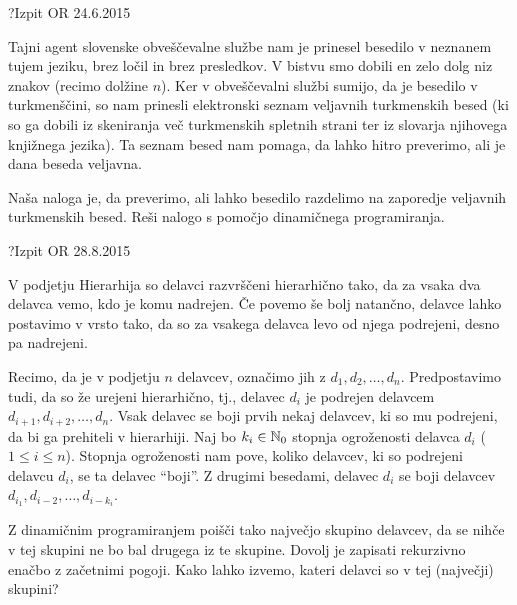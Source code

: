 \begin{naloga}{?}{Izpit OR 24.6.2015}
\begin{vprasanje}
Tajni agent slovenske obveščevalne službe
nam je prinesel besedilo v neznanem tujem jeziku,
brez ločil in brez presledkov.
V bistvu smo dobili en zelo dolg niz znakov (recimo dolžine $n$).
Ker v obveščevalni službi sumijo, da je besedilo v turkmenščini,
so nam prinesli elektronski seznam veljavnih turkmenskih besed
(ki so ga dobili iz skeniranja več turkmenskih spletnih strani
ter iz slovarja njihovega knjižnega jezika).
Ta seznam besed nam pomaga, da lahko hitro preverimo,
ali je dana beseda veljavna.

Naša naloga je, da preverimo,
ali lahko besedilo razdelimo na zaporedje veljavnih turkmenskih besed.
Reši nalogo s pomočjo dinamičnega programiranja.
\end{vprasanje}
\begin{odgovor}
\end{odgovor}
\end{naloga}


\begin{naloga}{?}{Izpit OR 28.8.2015}
\begin{vprasanje}
V podjetju Hierarhija so delavci razvrščeni hierarhično tako,
da za vsaka dva delavca vemo, kdo je komu nadrejen.
Če povemo še bolj natančno, delavce lahko postavimo v vrsto tako,
da so za vsakega delavca levo od njega podrejeni, desno pa nadrejeni.

Recimo, da je v podjetju $n$ delavcev, označimo jih z $d_1, d_2, \dots, d_n$.
Predpostavimo tudi, da so že urejeni hierarhično,
tj., delavec $d_i$ je podrejen delavcem $d_{i+1}, d_{i+2}, \dots, d_n$.
Vsak delavec se boji prvih nekaj delavcev, ki so mu podrejeni,
da bi ga prehiteli v hierarhiji.
Naj bo $k_i \in \mathbb{N}_0$ stopnja ogroženosti delavca $d_i$ ($1 \le i \le n$).
Stopnja ogroženosti nam pove,
koliko delavcev, ki so podrejeni delavcu $d_i$, se ta delavec ``boji''.
Z drugimi besedami,
delavec $d_i$ se boji delavcev $d_{i_1}, d_{i-2}, \dots, d_{i-k_i}$.

Z dinamičnim programiranjem poišči tako največjo skupino delavcev,
da se nihče v tej skupini ne bo bal drugega iz te skupine.
Dovolj je zapisati rekurzivno enačbo z začetnimi pogoji.
Kako lahko izvemo, kateri delavci so v tej (največji) skupini?
\end{vprasanje}
\begin{odgovor}
\end{odgovor}
\end{naloga}
